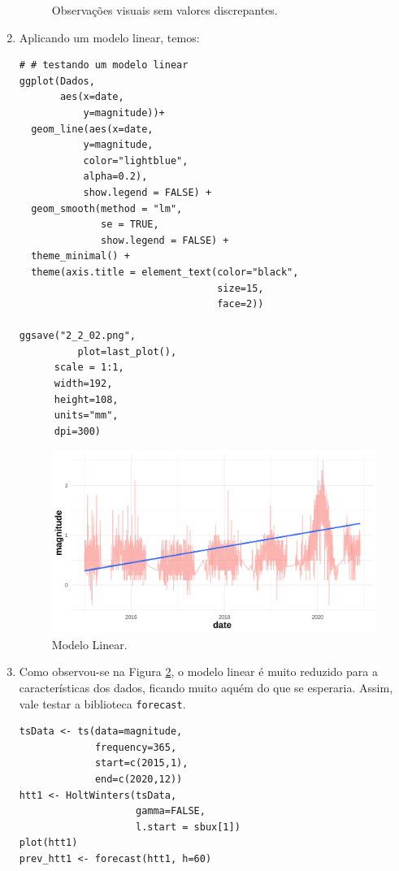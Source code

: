 \documentclass[a4paper,12pt]{article}
\begin{document}
\begin{enumerate}
\begin{figure}[h!tb]
             \caption{Observações visuais sem valores discrepantes.}
             \label{fig2obs}
        \end{figure}
    \item Aplicando um modelo linear, temos:
        \begin{lstlisting}
# # testando um modelo linear
ggplot(Dados,
       aes(x=date,     
           y=magnitude))+
  geom_line(aes(x=date,     
           y=magnitude,            
           color="lightblue",
           alpha=0.2), 
           show.legend = FALSE) + 
  geom_smooth(method = "lm", 
              se = TRUE,
              show.legend = FALSE) + 
  theme_minimal() +
  theme(axis.title = element_text(color="black", 
                                  size=15, 
                                  face=2))

ggsave("2_2_02.png",
          plot=last_plot(),
      scale = 1:1,
      width=192,
      height=108,
      units="mm",
      dpi=300)
        \end{lstlisting} 
        \begin{figure}[h!tb]
             \centering
             \includegraphics[scale=0.75]{2_2_02.png}
             \caption{Modelo Linear.}
             \label{fig2lin}
        \end{figure}
    \item Como observou-se na Figura \ref{fig2lin}, o modelo linear é muito reduzido para a características dos dados, ficando muito aquém do que se esperaria. Assim, vale testar a biblioteca \texttt{forecast}.
        \begin{lstlisting}
tsData <- ts(data=magnitude, 
             frequency=365, 
             start=c(2015,1), 
             end=c(2020,12))
htt1 <- HoltWinters(tsData, 
                    gamma=FALSE, 
                    l.start = sbux[1])
plot(htt1)
prev_htt1 <- forecast(htt1, h=60)

\end{lstlisting}
\end{enumerate}
\end{document}
